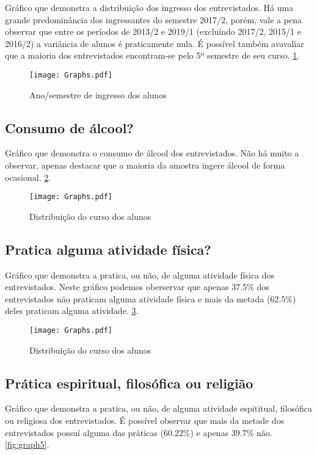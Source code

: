 \documentclass[11pt]{scrartcl} %
\begin{document}
Gráfico que demonstra a distribuição dos ingresso dos entrevistados. Há uma grande predominância dos ingressantes do semestre 2017/2, porém, vale a pena observar que entre os períodos de 2013/2 e 2019/1 (excluíndo 2017/2, 2015/1 e 2016/2) a variância de alunos é praticamente nula. É possível também avavaliar que a maioria dos entrevistados encontram-se pelo 5º semestre de seu curso. \ref{fig:graph2}.

\begin{figure}[h]
  \centering
  \texttt{[image: Graphs.pdf]}
  \label{fig:graph2}
  \caption{Ano/semestre de ingresso dos alunos}
\end{figure}

\subsection{Consumo de álcool?}

Gráfico que demonstra o consumo de álcool dos entrevistados. Não há muito a observar, apenas destacar que a maioria da amostra ingere álcool de forma ocasional. \ref{fig:graph3}.

\begin{figure}[h]
  \centering
  \texttt{[image: Graphs.pdf]}
  \label{fig:graph3}
  \caption{Distribuição do curso dos alunos}
\end{figure}

\subsection{Pratica alguma atividade física?}

Gráfico que demonstra a pratica, ou não, de alguma atividade física dos entrevistados. Neste gráfico podemos oberservar que apenas 37.5\% dos entrevistados não praticam alguma atividade física e mais da metada (62.5\%) deles praticam alguma atividade. \ref{fig:graph4}.

\begin{figure}[h]
  \centering
  \texttt{[image: Graphs.pdf]}
  \label{fig:graph4}
  \caption{Distribuição do curso dos alunos}
\end{figure}

\subsection{Prática espiritual, filosófica ou religião}

Gráfico que demonstra a pratica, ou não, de alguma atividade espititual, filosófica ou religiosa dos entrevistados. É possível observar que mais da metade dos entrevistados possuí alguma das práticas (60.22\%) e apenas 39.7\% não. \ref{fig:graph5}.
\end{document}
